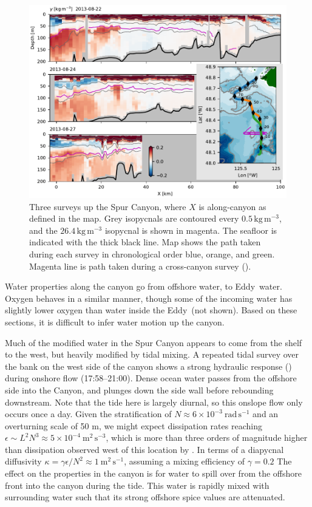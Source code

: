 \documentclass[draft]{agujournal2019}
\newcommand*{\Eddy}{{\sc Eddy}}
\begin{document}
\begin{figure}[htbp]
  \begin{center}
    \includegraphics[width=6.2in]{CanyonPropertiesSpice}
    \caption{Three surveys up the Spur Canyon, where $X$ is along-canyon as defined in the map.  Grey isopycnals are contoured every $0.5\,\mathrm{kg\,m^{-3}}$, and the $26.4\,\mathrm{kg\,m^{-3}}$ isopycnal is shown in magenta.  The seafloor is indicated with the thick black line.
      Map shows the path taken during each survey in chronological order blue, orange, and green.  Magenta line is path taken during a cross-canyon survey ().
      \label{fig:CanyonPropertiesSpice} }
  \end{center}
\end{figure}

Water properties along the canyon go from offshore water, to \Eddy\ water.  Oxygen behaves in a similar manner, though some of the incoming water has slightly lower oxygen than water inside the \Eddy\ (not shown).  Based on these sections, it is difficult to infer water motion up the canyon.

Much of the modified water in the Spur Canyon appears to come from the shelf to the west, but heavily modified by tidal mixing. A repeated tidal survey over the bank on the west side of the canyon shows a strong hydraulic response () during onshore flow (17:58--21:00).  Dense ocean water passes from the offshore side into the Canyon, and plunges down the side wall before rebounding downstream.  Note that the tide here is largely diurnal, so this onslope flow only occurs once a day.  Given the stratification of $N\approx 6\times10^{-3} \ \mathrm{rad\,s^{-1}}$ and an overturning scale of 50 m, we might expect dissipation rates reaching $\epsilon \sim L^2N^{3} \approx 5\times10^{-4}\ \mathrm{m^2\,s^{-3}}$, which is more than three orders of magnitude higher than dissipation observed west of this location by .  In terms of a diapycnal diffusivity $\kappa = \gamma \epsilon / N^2 \approx 1\ \mathrm{m^2\,s^{-1}}$, assuming a mixing efficiency of $\gamma=0.2$ The effect on the properties in the canyon is for water to spill over from the offshore front into the canyon during the tide.  This water is rapidly mixed with surrounding water such that its strong offshore spice values are attenuated.
\end{document}
